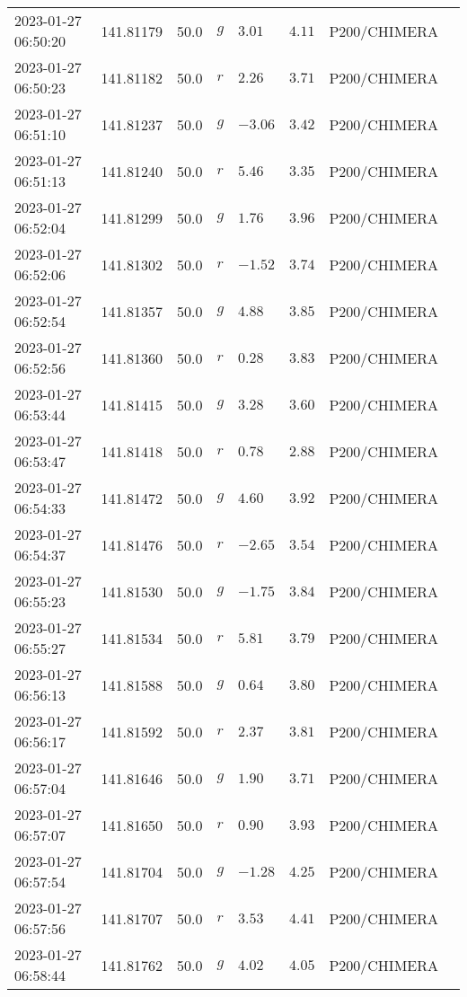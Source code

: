 \documentclass{nature_plusfigure}
\begin{document}
\begin{supplement}
\begin{center}
\begin{longtable}{llllllll}
2023-01-27 06:50:20 & 141.81179 & 50.0 & $g$ & $3.01$ & $4.11$ & P200/CHIMERA &  \\ 
2023-01-27 06:50:23 & 141.81182 & 50.0 & $r$ & $2.26$ & $3.71$ & P200/CHIMERA &  \\ 
2023-01-27 06:51:10 & 141.81237 & 50.0 & $g$ & $-3.06$ & $3.42$ & P200/CHIMERA &  \\ 
2023-01-27 06:51:13 & 141.81240 & 50.0 & $r$ & $5.46$ & $3.35$ & P200/CHIMERA &  \\ 
2023-01-27 06:52:04 & 141.81299 & 50.0 & $g$ & $1.76$ & $3.96$ & P200/CHIMERA &  \\ 
2023-01-27 06:52:06 & 141.81302 & 50.0 & $r$ & $-1.52$ & $3.74$ & P200/CHIMERA &  \\ 
2023-01-27 06:52:54 & 141.81357 & 50.0 & $g$ & $4.88$ & $3.85$ & P200/CHIMERA &  \\ 
2023-01-27 06:52:56 & 141.81360 & 50.0 & $r$ & $0.28$ & $3.83$ & P200/CHIMERA &  \\ 
2023-01-27 06:53:44 & 141.81415 & 50.0 & $g$ & $3.28$ & $3.60$ & P200/CHIMERA &  \\ 
2023-01-27 06:53:47 & 141.81418 & 50.0 & $r$ & $0.78$ & $2.88$ & P200/CHIMERA &  \\ 
2023-01-27 06:54:33 & 141.81472 & 50.0 & $g$ & $4.60$ & $3.92$ & P200/CHIMERA &  \\ 
2023-01-27 06:54:37 & 141.81476 & 50.0 & $r$ & $-2.65$ & $3.54$ & P200/CHIMERA &  \\ 
2023-01-27 06:55:23 & 141.81530 & 50.0 & $g$ & $-1.75$ & $3.84$ & P200/CHIMERA &  \\ 
2023-01-27 06:55:27 & 141.81534 & 50.0 & $r$ & $5.81$ & $3.79$ & P200/CHIMERA &  \\ 
2023-01-27 06:56:13 & 141.81588 & 50.0 & $g$ & $0.64$ & $3.80$ & P200/CHIMERA &  \\ 
2023-01-27 06:56:17 & 141.81592 & 50.0 & $r$ & $2.37$ & $3.81$ & P200/CHIMERA &  \\ 
2023-01-27 06:57:04 & 141.81646 & 50.0 & $g$ & $1.90$ & $3.71$ & P200/CHIMERA &  \\ 
2023-01-27 06:57:07 & 141.81650 & 50.0 & $r$ & $0.90$ & $3.93$ & P200/CHIMERA &  \\ 
2023-01-27 06:57:54 & 141.81704 & 50.0 & $g$ & $-1.28$ & $4.25$ & P200/CHIMERA &  \\ 
2023-01-27 06:57:56 & 141.81707 & 50.0 & $r$ & $3.53$ & $4.41$ & P200/CHIMERA &  \\ 
2023-01-27 06:58:44 & 141.81762 & 50.0 & $g$ & $4.02$ & $4.05$ & P200/CHIMERA &  \\ 

\end{longtable}
\end{center}
\end{supplement}
\end{document}
